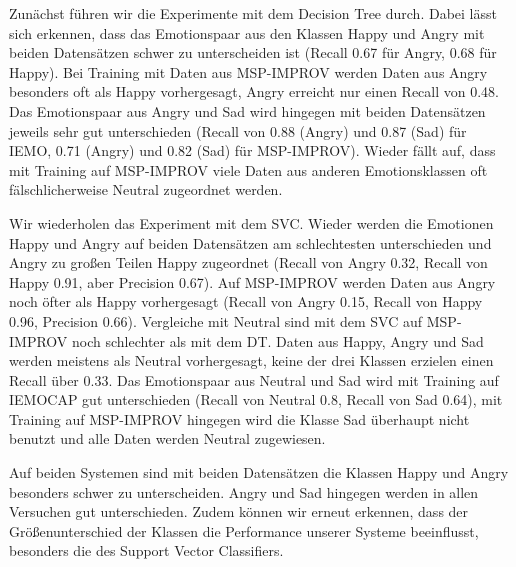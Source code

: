 \documentclass{article} %
\begin{document}
Zunächst führen wir die Experimente mit dem Decision Tree durch.
Dabei lässt sich erkennen, dass das Emotionspaar aus den Klassen Happy und Angry mit beiden Datensätzen schwer zu unterscheiden ist (Recall 0.67 für Angry, 0.68 für Happy). Bei Training mit Daten aus MSP-IMPROV werden Daten aus Angry besonders oft als Happy vorhergesagt, Angry erreicht nur einen Recall von 0.48. 
Das Emotionspaar aus Angry und Sad wird hingegen mit beiden Datensätzen jeweils sehr gut unterschieden (Recall von 0.88 (Angry) und 0.87 (Sad) für IEMO, 0.71 (Angry) und 0.82 (Sad) für MSP-IMPROV). 
Wieder fällt auf, dass mit Training auf MSP-IMPROV viele Daten aus anderen Emotionsklassen oft fälschlicherweise Neutral zugeordnet werden. 

Wir wiederholen das Experiment mit dem SVC.
Wieder werden die Emotionen Happy und Angry auf beiden Datensätzen am schlechtesten unterschieden und Angry zu großen Teilen Happy zugeordnet (Recall von Angry 0.32, Recall von Happy 0.91, aber Precision 0.67). Auf MSP-IMPROV werden Daten aus Angry noch öfter als Happy vorhergesagt (Recall von Angry 0.15, Recall von Happy 0.96, Precision 0.66).
Vergleiche mit Neutral sind mit dem SVC auf MSP-IMPROV noch schlechter als mit dem DT. Daten aus Happy, Angry und Sad werden meistens als Neutral vorhergesagt, keine der drei Klassen erzielen einen Recall über 0.33.
Das Emotionspaar aus Neutral und Sad wird mit Training auf IEMOCAP gut unterschieden (Recall von Neutral 0.8, Recall von Sad 0.64), mit Training auf MSP-IMPROV hingegen wird die Klasse Sad überhaupt nicht benutzt und alle Daten werden Neutral zugewiesen. 

Auf beiden Systemen sind mit beiden Datensätzen die Klassen Happy und Angry besonders schwer zu unterscheiden. Angry und Sad hingegen werden in allen Versuchen gut unterschieden. Zudem können wir erneut erkennen, dass der Größenunterschied der Klassen die Performance unserer Systeme beeinflusst, besonders die des Support Vector Classifiers.
\end{document}
